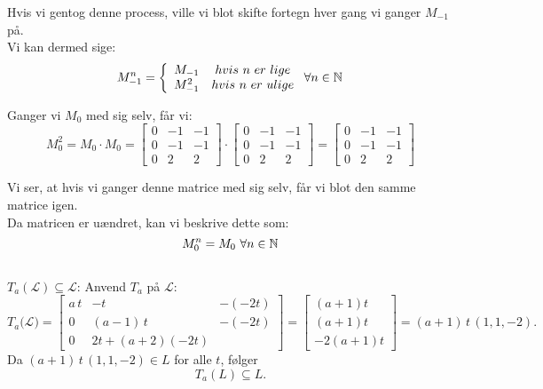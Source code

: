 \documentclass[a4paper,12pt]{article}
\begin{document}
Hvis vi gentog denne process, ville vi blot skifte fortegn hver gang vi ganger $M_{-1}$ på.\\
Vi kan dermed sige:\\

\[
M_{-1}^n = \left\{
\begin{array}{cc}
    M_{-1} & hvis \ n \ er \ lige
    \\
    M_{-1}^2 & hvis \ n \ er \ ulige
\end{array}
\ \forall n\in \mathbb{N} \\
\right.
\]

Ganger vi $M_0$ med sig selv, får vi:\\
\[
M_{0}^2 = M_{0}\cdot M_{0}=
\left[\begin{array}{ccc}
    0 & -1 & -1 \\
    0 & -1 & -1 \\
    0 & 2 & 2
\end{array}\right]
\cdot
\left[\begin{array}{ccc}
    0 & -1 & -1 \\
    0 & -1 & -1 \\
    0 & 2 & 2
\end{array}\right]
=
\left[\begin{array}{ccc}
    0 & -1 & -1 \\
    0 & -1 & -1 \\
    0 & 2 & 2
\end{array}\right]
\]

Vi ser, at hvis vi ganger denne matrice med sig selv, får vi blot den samme matrice igen.\\
Da matricen er uændret, kan vi beskrive dette som:
\[
M_{0}^n = M_0 \ \forall n \in \mathbb{N}
\]

\subsection{}

 \(T_a(\mathcal{L})\subseteq \mathcal{L}\):
Anvend \(T_a\) på \(\mathcal{L}\):
  \[
    T_a\bigl(\mathcal{L})
    = \left[\begin{array}{ccc}
        a\,t & - t & -(-2t)\\[6pt]
        0& (a-1)\,t & -(-2t)\\[6pt]
        0 & 2t + (a+2)(-2t)
      \end{array}\right]
    = \left[\begin{array}{ccc}
        (a+1)t\\[3pt]
        (a+1)t\\[3pt]
        -2(a+1)t
      \end{array}\right]
    = (a+1)\,t\,(1,1,-2).
  \]
Da \((a+1)\,t\,(1,1,-2)\in L\) for alle \(t\), følger
  \[
    T_a(L)\subseteq L.
  \]
\end{document}
